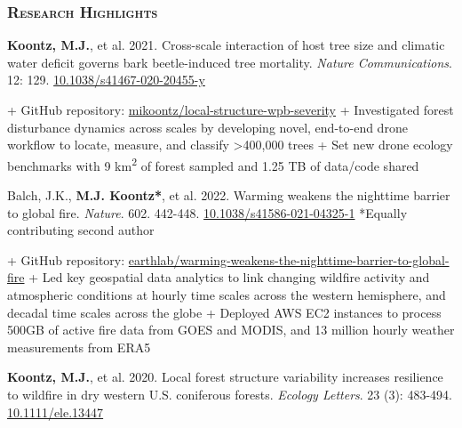 \documentclass[10pt,english]{article}
\begin{document}

\subsubsection*{\textsc{Research Highlights}}

\textbf{Koontz, M.J.}, et al. 2021. Cross-scale interaction of host tree size and climatic water deficit governs bark beetle-induced tree mortality. \emph{Nature Communications}. 12: 129. \href{https://doi.org/10.1038/s41467-020-20455-y}{10.1038/s41467-020-20455-y}

\begin{addmargin}[1ex]{0ex}%
+ GitHub repository: \href{https://github.com/mikoontz/local-structure-wpb-severity}{mikoontz/local-structure-wpb-severity} \newline
+ Investigated forest disturbance dynamics across scales by developing novel, end-to-end drone workflow to locate, measure, and classify >400,000 trees \newline
+ Set new drone ecology benchmarks with 9 km\textsuperscript{2} of forest sampled and 1.25 TB of data/code shared
\end{addmargin}

\vspace{1ex}

Balch, J.K., \textbf{M.J. Koontz*}, et al. 2022. Warming weakens the nighttime barrier to global fire. \emph{Nature}. 602. 442-448. \href{https://doi.org/10.1038/s41586-021-04325-1}{10.1038/s41586-021-04325-1} *Equally contributing second author

\begin{addmargin}[1ex]{0ex}%
+ GitHub repository: \href{https://github.com/earthlab/warming-weakens-the-nighttime-barrier-to-global-fire}{earthlab/warming-weakens-the-nighttime-barrier-to-global-fire} \newline 
+ Led key geospatial data analytics to link changing wildfire activity and atmospheric conditions at hourly time scales across the western hemisphere, and decadal time scales across the globe \newline 
+ Deployed AWS EC2 instances to process 500GB of active fire data from GOES and MODIS, and 13 million hourly weather measurements from ERA5
\end{addmargin}

\vspace{1ex}

\textbf{Koontz, M.J.}, et al. 2020. Local forest structure variability increases resilience to wildfire in dry western U.S. coniferous forests. \emph{Ecology Letters}. 23 (3): 483-494. \href{https://doi.org/10.1111/ele.13447}{10.1111/ele.13447} 
\end{document}
